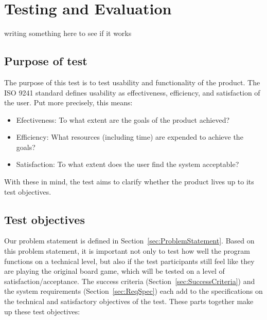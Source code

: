 \chapter{Testing and Evaluation}\label{ch:testeval}
writing something here to see if it works

\section{Purpose of test}
The purpose of this test is to test usability and functionality of the product. The ISO 9241 \citep{ISO} standard defines usability as effectiveness, efficiency, and satisfaction of the user. Put more precisely, this means:
\begin{itemize}
\item Efectiveness: To what extent are the goals of the product achieved?
\item Efficiency: What resources (including time) are expended to achieve the goals?
\item Satisfaction: To what extent does the user find the system acceptable?
\end{itemize}
With these in mind, the test aims to clarify whether the product lives up to its test objectives.

\section{Test objectives}
Our problem statement is defined in Section~\ref{sec:ProblemStatement}. Based on this problem statement, it is important not only to test how well the program functions on a technical level, but also if the test participants still feel like they are playing the original board game, which will be tested on a level of satisfaction/acceptance.
The success criteria (Section~\ref{sec:SuccessCriteria}) and the system requirements (Section~\ref{sec:ReqSpec}) each add to the specifications on the technical and satisfactory  objectives of the test.
These parts together make up these test objectives:

